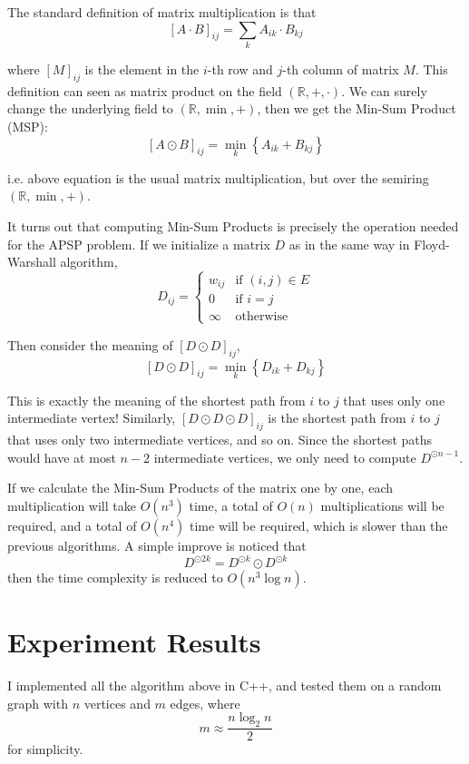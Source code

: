 \documentclass[11pt]{article}
\theoremstyle{plain}
\begin{document}
The standard definition of matrix multiplication is that
\[
  [A\cdot B]_{ij} = \sum_{k} A_{ik} \cdot B_{kj}
\]

where $[M]_{ij}$ is the element in the $i$-th row and $j$-th column of matrix $M$.
This definition can seen as matrix product on the field $(\mathbb{R}, +, \cdot)$.
We can surely change the underlying field to $(\mathbb{R}, \min, +)$, then we get the
Min-Sum Product (MSP):
\[
  [A\odot B]_{ij} = \min_{k} \left\{ A_{ik} + B_{kj} \right\} 
\]

i.e. above equation is the usual matrix multiplication, but over the semiring $(\mathbb{R}, \min, +)$.

It turns out that computing Min-Sum Products is precisely the operation needed for the APSP problem.
If we initialize a matrix $D$ as in the same way in Floyd-Warshall algorithm,
\[
  D_{ij} = \begin{cases}
    w_{ij} & \text{if } (i, j) \in E \\
    0 & \text{if } i = j \\
    \infty & \text{otherwise}
  \end{cases}
\]

Then consider the meaning of $[D \odot D]_{ij}$,
\[
  [D \odot D]_{ij} = \min_{k} \left\{ D_{ik} + D_{kj} \right\}
\]

This is exactly the meaning of the shortest path from $i$ to $j$ that uses only one intermediate vertex!
Similarly, $[D \odot D \odot D]_{ij}$ is the shortest path from $i$ to $j$ that uses only two intermediate vertices, and so on.
Since the shortest paths would have at most $n-2$ intermediate vertices, we only need to compute $D^{\odot n-1}$.

If we calculate the Min-Sum Products of the matrix one by one, each multiplication will take $O(n^3)$ time, 
a total of $O(n)$ multiplications will be required, and a total of $O(n^4)$ time will be required, which is 
slower than the previous algorithms. A simple improve is noticed that 
\[
  D^{\odot 2k} = D^{\odot k}\odot D^{\odot k}
\]
then the time complexity is reduced to $O(n^3 \log n)$.

\section{Experiment Results}

I implemented all the algorithm above in C++, and tested them on a random graph with $n$ vertices and $m$ edges, where 
\[
  m \approx \frac{n \log_2 n}{2}
\]
for simplicity.
\end{document}
